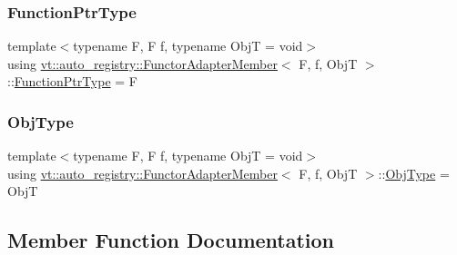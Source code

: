 \subsubsection{\texorpdfstring{Function\+Ptr\+Type}{FunctionPtrType}}
{\footnotesize\ttfamily template$<$typename F, F f, typename ObjT = void$>$ \\
using \hyperlink{structvt_1_1auto__registry_1_1_functor_adapter_member}{vt\+::auto\+\_\+registry\+::\+Functor\+Adapter\+Member}$<$ F, f, ObjT $>$\+::\hyperlink{structvt_1_1auto__registry_1_1_functor_adapter_member_a91cba3c1b53b4335861ba94ed69f212b}{Function\+Ptr\+Type} =  F}

\mbox{\label{structvt_1_1auto__registry_1_1_functor_adapter_member_a9bd2d75569c62fbdcf7539e50c9433ba}} 
\subsubsection{\texorpdfstring{Obj\+Type}{ObjType}}
{\footnotesize\ttfamily template$<$typename F, F f, typename ObjT = void$>$ \\
using \hyperlink{structvt_1_1auto__registry_1_1_functor_adapter_member}{vt\+::auto\+\_\+registry\+::\+Functor\+Adapter\+Member}$<$ F, f, ObjT $>$\+::\hyperlink{structvt_1_1auto__registry_1_1_functor_adapter_member_a9bd2d75569c62fbdcf7539e50c9433ba}{Obj\+Type} =  ObjT}



\subsection{Member Function Documentation}
\mbox{\label{structvt_1_1auto__registry_1_1_functor_adapter_member_a553928b633138999f824d2f67315af76}} 
